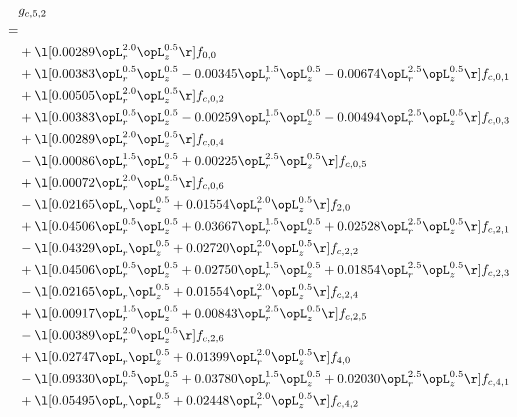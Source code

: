 \begin{alignat}{2} 
\label{eq:g_52_0} 
& g_{c,5,2} \nonumber \\ 
 = \\ 
& + \l[  0.00289 \opL_r^{2.0} \opL_z^{0.5}  \r] f_{0,0} \nonumber \\ 
& + \l[  0.00383 \opL_r^{0.5} \opL_z^{0.5}   -0.00345 \opL_r^{1.5} \opL_z^{0.5}   -0.00674 \opL_r^{2.5} \opL_z^{0.5}  \r] f_{c,0,1} \nonumber \\ 
& + \l[  0.00505 \opL_r^{2.0} \opL_z^{0.5}  \r] f_{c,0,2} \nonumber \\ 
& + \l[  0.00383 \opL_r^{0.5} \opL_z^{0.5}   -0.00259 \opL_r^{1.5} \opL_z^{0.5}   -0.00494 \opL_r^{2.5} \opL_z^{0.5}  \r] f_{c,0,3} \nonumber \\ 
& + \l[  0.00289 \opL_r^{2.0} \opL_z^{0.5}  \r] f_{c,0,4} \nonumber \\ 
& - \l[  0.00086 \opL_r^{1.5} \opL_z^{0.5} +  0.00225 \opL_r^{2.5} \opL_z^{0.5}  \r] f_{c,0,5} \nonumber \\ 
& + \l[  0.00072 \opL_r^{2.0} \opL_z^{0.5}  \r] f_{c,0,6} \nonumber \\ 
& - \l[  0.02165 \opL_r \opL_z^{0.5} +  0.01554 \opL_r^{2.0} \opL_z^{0.5}  \r] f_{2,0} \nonumber \\ 
& + \l[  0.04506 \opL_r^{0.5} \opL_z^{0.5} +  0.03667 \opL_r^{1.5} \opL_z^{0.5} +  0.02528 \opL_r^{2.5} \opL_z^{0.5}  \r] f_{c,2,1} \nonumber \\ 
& - \l[  0.04329 \opL_r \opL_z^{0.5} +  0.02720 \opL_r^{2.0} \opL_z^{0.5}  \r] f_{c,2,2} \nonumber \\ 
& + \l[  0.04506 \opL_r^{0.5} \opL_z^{0.5} +  0.02750 \opL_r^{1.5} \opL_z^{0.5} +  0.01854 \opL_r^{2.5} \opL_z^{0.5}  \r] f_{c,2,3} \nonumber \\ 
& - \l[  0.02165 \opL_r \opL_z^{0.5} +  0.01554 \opL_r^{2.0} \opL_z^{0.5}  \r] f_{c,2,4} \nonumber \\ 
& + \l[  0.00917 \opL_r^{1.5} \opL_z^{0.5} +  0.00843 \opL_r^{2.5} \opL_z^{0.5}  \r] f_{c,2,5} \nonumber \\ 
& - \l[  0.00389 \opL_r^{2.0} \opL_z^{0.5}  \r] f_{c,2,6} \nonumber \\ 
& + \l[  0.02747 \opL_r \opL_z^{0.5} +  0.01399 \opL_r^{2.0} \opL_z^{0.5}  \r] f_{4,0} \nonumber \\ 
& - \l[  0.09330 \opL_r^{0.5} \opL_z^{0.5} +  0.03780 \opL_r^{1.5} \opL_z^{0.5} +  0.02030 \opL_r^{2.5} \opL_z^{0.5}  \r] f_{c,4,1} \nonumber \\ 
& + \l[  0.05495 \opL_r \opL_z^{0.5} +  0.02448 \opL_r^{2.0} \opL_z^{0.5}  \r] f_{c,4,2} \nonumber \\ 

\end{alignat}
